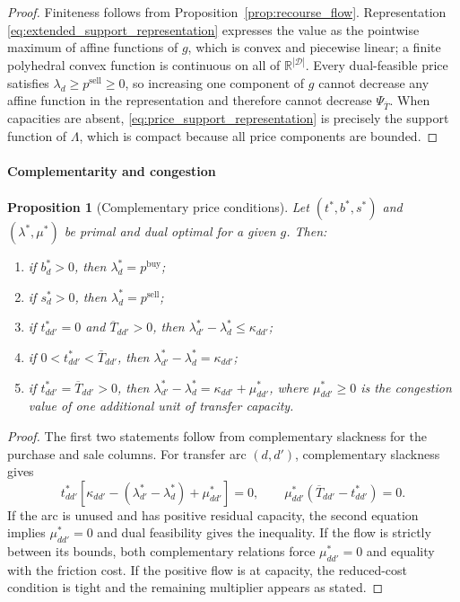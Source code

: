 \documentclass[authoryear,final,3p,times]{elsarticle}
\newtheorem{proposition}{Proposition}
\theoremstyle{definition}
\theoremstyle{plain}
\begin{document}
\begin{proof}
Finiteness follows from Proposition~\ref{prop:recourse_flow}.  Representation
\eqref{eq:extended_support_representation} expresses the value as the pointwise
maximum of affine functions of $g$, which is convex and piecewise linear; a
finite polyhedral convex function is continuous on all of
$\mathbb R^{|\mathcal D|}$.  Every dual-feasible price satisfies
$\lambda_d\ge p^{\mathrm{sell}}\ge0$, so increasing one component of $g$ cannot
decrease any affine function in the representation and therefore cannot
decrease $\Psi_{\overline T}$.  When capacities are absent,
\eqref{eq:price_support_representation} is precisely the support function of
$\Lambda$, which is compact because all price components are bounded.
\end{proof}

\paragraph{Complementarity and congestion}

\begin{proposition}[Complementary price conditions]
\label{prop:complementarity}
Let $(t^*,b^*,s^*)$ and $(\lambda^*,\mu^*)$ be primal and dual optimal for a
given $g$.  Then:
\begin{enumerate}
\item if $b_d^*>0$, then $\lambda_d^*=p^{\mathrm{buy}}$;
\item if $s_d^*>0$, then $\lambda_d^*=p^{\mathrm{sell}}$;
\item if $t_{dd'}^*=0$ and $\overline T_{dd'}>0$, then
      $\lambda_{d'}^*-\lambda_d^*\le\kappa_{dd'}$;
\item if $0<t_{dd'}^*<\overline T_{dd'}$, then
      $\lambda_{d'}^*-\lambda_d^*=\kappa_{dd'}$;
\item if $t_{dd'}^*=\overline T_{dd'}>0$, then
      $\lambda_{d'}^*-\lambda_d^*=\kappa_{dd'}+\mu_{dd'}^*$, where
      $\mu_{dd'}^*\ge0$ is the congestion value of one additional unit of
      transfer capacity.
\end{enumerate}
\end{proposition}

\begin{proof}
The first two statements follow from complementary slackness for the purchase
and sale columns.  For transfer arc $(d,d')$, complementary slackness gives
\begin{equation*}
t_{dd'}^*\left[
\kappa_{dd'}-(\lambda_{d'}^*-\lambda_d^*)+\mu_{dd'}^*
\right]=0,
\qquad
\mu_{dd'}^*(\overline T_{dd'}-t_{dd'}^*)=0.
\end{equation*}
If the arc is unused and has positive residual capacity, the second equation
implies $\mu_{dd'}^*=0$ and dual feasibility gives the inequality.  If the
flow is strictly between its bounds, both complementary relations force
$\mu_{dd'}^*=0$ and equality with the friction cost.  If the positive flow is
at capacity, the reduced-cost condition is tight and the remaining multiplier
appears as stated.
\end{proof}
\end{document}

